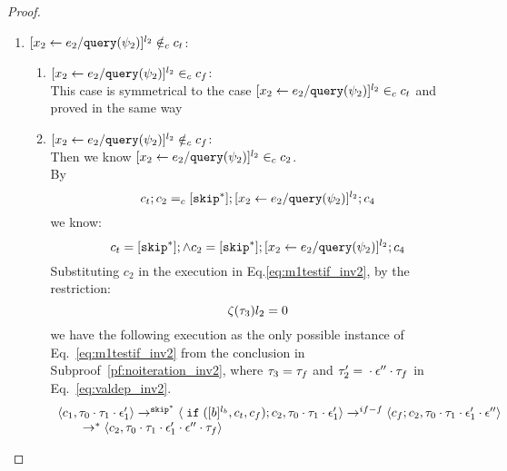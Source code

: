 {\begin{proof}
\begin{subproof}
\begin{enumerate}
 and $\eif ([b]^{l_b}, c_t, c_f) \in_c c_2$ and $[\assign{{x}_2}{\expr_2 / \query(\qexpr_2)}]^{l_2} \in_c c_t$. 
\\
%
i.e., $[\assign{{x}_2}{\expr_2 / \query(\qexpr_2)}]^{l_2}$ will only show up in $c_t$.
\\
%
By $\flowsto$ definition, we have:
\[
  \forall z_i^{r_i} \in \lvar_{c_t},  x_j^{l_j} \in \lvar_c \st x_j \in VAR(b) \land x_j^{l_j} \in \live^{l_b}(c) \implies
  \flowsto(x_j^{l_j}, z_i^{r_i})
\]
%
Since $x_1 \in VAR(b)$ and $x_1^{l_1} \in \live^{l_b}(c)$, we know:
%
\[
\flowsto(x_1^{l_1}, x_2^{l_2})
\]
%
i.e.,
\[
\Big(\exists z_1^{r_1}, \cdots, z_n^{r_n} \in \lvar_{{c}} \st 0 \leq n 
 \land \flowsto(x_1^{l_1}, z_1^{r_1}) \land \cdots \land \flowsto(z_n^{r_n}, {x}_2^{l_2}) \Big)
\]
%
This case is proved.
\item $[\mathrel{ {x}_2 \leftarrow e_2 / {\tt query}(\psi_2) }]^{l_2} \notin_c c_t$:
\begin{enumerate}
 \item $[\mathrel{ {x}_2 \leftarrow e_2 / {\tt query}(\psi_2) }]^{l_2} \in_c c_f$:
 \\
 This case is symmetrical to the case $[\assign{{x}_2}{\expr_2 / \query(\qexpr_2)}]^{l_2} \in_c c_t$ and proved in the same way
 \item $[\mathrel{ {x}_2 \leftarrow e_2 / {\tt query}(\psi_2) }]^{l_2} \notin_c c_f$:
 \\
 Then we know $[\mathrel{ {x}_2 \leftarrow e_2 / {\tt query}(\psi_2) }]^{l_2} \in_c c_2$.
 \\
 By
 \[
  c_t;c_2 =_c [\mathtt{skip}^*]; [\mathrel{ {x}_2 \leftarrow e_2 / {\tt query}(\psi_2) }]^{l_2};{c}_4
\]
we know:
\[
  c_t = [\mathtt{skip}^*]; \land c_2 = [\mathtt{skip}^*]; [\mathrel{ {x}_2 \leftarrow e_2 / {\tt query}(\psi_2) }]^{l_2};{c}_4
\]
Substituting $c_2$ in the execution in Eq.\ref{eq:m1testif_inv2}, by the restriction:
\[
  \mathtt{\zeta}(\mathtt{\tau}_3)l_2 = 0
\]
we have the following execution as the only possible instance of Eq.~\ref{eq:m1testif_inv2} from the conclusion in Subproof~\ref{pf:noiteration_inv2}, where $\mathtt{\tau}_3 = \mathtt{\tau}_f$ 
and $\mathtt{\tau}_2' = {} \cdot {} \mathtt{\epsilon}'' \cdot \mathtt{\tau}_f$ in Eq.~\ref{eq:valdep_inv2}.
\[
    \begin{array}{l}   
  \langle c_1, \mathtt{\tau}_0 \cdot \mathtt{\tau}_1 \cdot \mathtt{\epsilon}_1' \rangle 
  \rightarrow^{\mathtt{skip}^*} 
  \langle \;\mathtt{if}\; ([b]^{l_b}, c_t, c_f); {c}_2, \mathtt{\tau}_0 \cdot \mathtt{\tau}_1 \cdot \mathtt{\epsilon}_1' \rangle 
  \rightarrow^{if-f} 
  \langle c_f;c_2, \mathtt{\tau}_0 \cdot \mathtt{\tau}_1 \cdot \mathtt{\epsilon}_1' \cdot \mathtt{\epsilon}'' \rangle 
  \\
  \qquad \rightarrow^{*} 
  \langle c_2, 
  \mathtt{\tau}_0 \cdot \mathtt{\tau}_1 \cdot \mathtt{\epsilon}_1' \cdot \mathtt{\epsilon}'' \cdot \mathtt{\tau}_f \rangle

\end{array}\]
\end{enumerate}
\end{enumerate}
\end{subproof}
\end{proof}}
